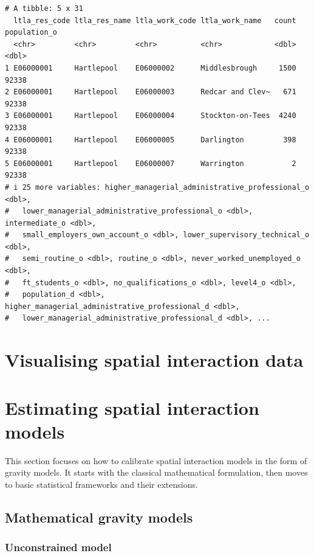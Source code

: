 \documentclass[
  a4paper, 
  twoside,
  final
]{article}
\newcounter{code}
\begin{document}
\begin{verbatim}
# A tibble: 5 x 31
  ltla_res_code ltla_res_name ltla_work_code ltla_work_name   count population_o
  <chr>         <chr>         <chr>          <chr>            <dbl>        <dbl>
1 E06000001     Hartlepool    E06000002      Middlesbrough     1500        92338
2 E06000001     Hartlepool    E06000003      Redcar and Clev~   671        92338
3 E06000001     Hartlepool    E06000004      Stockton-on-Tees  4240        92338
4 E06000001     Hartlepool    E06000005      Darlington         398        92338
5 E06000001     Hartlepool    E06000007      Warrington           2        92338
# i 25 more variables: higher_managerial_administrative_professional_o <dbl>,
#   lower_managerial_administrative_professional_o <dbl>, intermediate_o <dbl>,
#   small_employers_own_account_o <dbl>, lower_supervisory_technical_o <dbl>,
#   semi_routine_o <dbl>, routine_o <dbl>, never_worked_unemployed_o <dbl>,
#   ft_students_o <dbl>, no_qualifications_o <dbl>, level4_o <dbl>,
#   population_d <dbl>, higher_managerial_administrative_professional_d <dbl>,
#   lower_managerial_administrative_professional_d <dbl>, ...
\end{verbatim}

\section{Visualising spatial interaction data}\label{sec-visualising}

\section{Estimating spatial interaction models}\label{sec-modelling}

This section focuses on how to calibrate spatial interaction models in
the form of gravity models. It starts with the classical mathematical
formulation, then moves to basic statistical frameworks and their
extensions.

\subsection{Mathematical gravity
models}\label{mathematical-gravity-models}

\subsubsection{Unconstrained model}\label{unconstrained-model}
\end{document}
